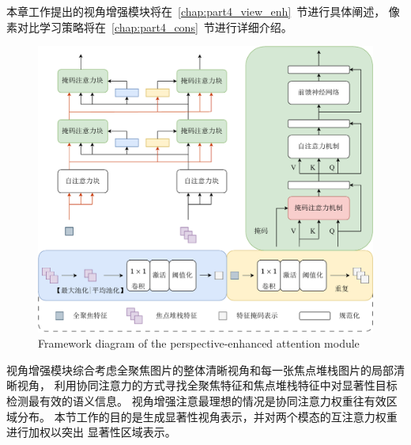 \indent
本章工作提出的视角增强模块将在~\ref{chap:part4_view_enh}~节进行具体阐述，
像素对比学习策略将在~\ref{chap:part4_cons}~节进行详细介绍。
%
%
%
%
\label{chap:part4_view_enh}
\begin{figure}[!ht]
	\centering
	\includegraphics[width=0.95\linewidth]{figures/chapter4/view_enhance}
	{Framework diagram of the perspective-enhanced attention module}
	\label{cpt4_fig1:view_enhance}
\end{figure}
视角增强模块综合考虑全聚焦图片的整体清晰视角和每一张焦点堆栈图片的局部清晰视角，
利用协同注意力的方式寻找全聚焦特征和焦点堆栈特征中对显著性目标检测最有效的语义信息。
视角增强注意最理想的情况是协同注意力权重往有效区域分布。
本节工作的目的是生成显著性视角表示，并对两个模态的互注意力权重进行加权以突出
显著性区域表示。


